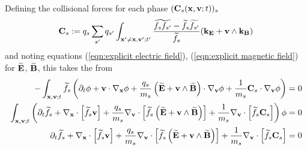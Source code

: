     Defining the collisional forces for each phase $(\mathbf{C}_{s}(\mathbf{x}, \mathbf{v}; t))_{s}$
    \begin{equation}
        \mathbf{C}_{s}  :=  q_{s}\sum_{s'}q_{s'}\int_{\mathbf{x}' \neq \mathbf{x}, \mathbf{v}'; t'}\frac{\widetilde{f_{s}f_{s'}} - \widetilde{f_{s}}\widetilde{f_{s'}}}{\widetilde{f_{s}}}(\mathbf{k}_{\mathbf{E}}  + \mathbf{v}\wedge\mathbf{k}_{\mathbf{B}})
    \end{equation}
    and noting equations (\ref{eqn:explicit electric field}), (\ref{eqn:explicit magnetic field}) for $\widetilde{\mathbf{E}}$, $\widetilde{\mathbf{B}}$, this takes the from
    \begin{align}
        - \int_{\mathbf{x}, \mathbf{v}; t}\widetilde{f_{s}}\left(\partial_{t}\phi + \mathbf{v}\cdot\nabla_{\mathbf{x}}\phi + \frac{q_{s}}{m_{s}}\left(\widetilde{\mathbf{E}} + \mathbf{v}\wedge\widetilde{\mathbf{B}}\right)\cdot\nabla_{\mathbf{v}}\phi + \frac{1}{m_{s}}\mathbf{C}_{s}\cdot\nabla_{\mathbf{v}}\phi\right)  &=  0  \\
        \int_{\mathbf{x}, \mathbf{v}; t}\left(\partial_{t}\widetilde{f_{s}} + \nabla_{\mathbf{x}}\cdot\left[\widetilde{f_{s}}\mathbf{v}\right] + \frac{q_{s}}{m_{s}}\nabla_{\mathbf{v}}\cdot\left[\widetilde{f_{s}}\left(\widetilde{\mathbf{E}} + \mathbf{v}\wedge\widetilde{\mathbf{B}}\right)\right] + \frac{1}{m_{s}}\nabla_{\mathbf{v}}\cdot\left[\widetilde{f_{s}}\mathbf{C}_{s}\right]\right)\phi  &=  0  \\
        \partial_{t}\widetilde{f_{s}} + \nabla_{\mathbf{x}}\cdot\left[\widetilde{f_{s}}\mathbf{v}\right] + \frac{q_{s}}{m_{s}}\nabla_{\mathbf{v}}\cdot\left[\widetilde{f_{s}}\left(\widetilde{\mathbf{E}} + \mathbf{v}\wedge\widetilde{\mathbf{B}}\right)\right] + \frac{1}{m_{s}}\nabla_{\mathbf{v}}\cdot\left[\widetilde{f_{s}}\mathbf{C}_{s}\right]  &=  0
    \end{align}

    